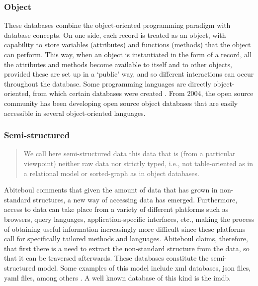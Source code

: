 \subsubsection{Object}
\label{model:object}


These databases combine the object-oriented programming paradigm with database concepts. On one side, each record is treated as an object, with capability to store variables (attributes) and functions (methods) that the object can perform. This way, when an object is instantiated in the form of a record, all the attributes and methods become available to itself and to other objects, provided these are set up in a `public' way, and so different interactions can occur throughout the database. Some programming languages are directly object-oriented, from which certain databases were created . From 2004, the open source community has been developing open source object databases that are easily accessible in several object-oriented languages.

\subsubsection{Semi-structured}
\label{model:semistructured}


\begin{quote}
	We call here semi-structured data this data that is (from a particular viewpoint) neither raw data nor strictly typed, i.e., not table-oriented as in a relational model or sorted-graph as in object databases. \parencite{Abiteboul:semistructured:96}
\end{quote}

Abiteboul \parencite{Abiteboul:semistructured:96} comments that given the amount of data that has grown in non-standard structures, a new way of accessing data has emerged. Furthermore, access to data can take place from a variety of different platforms such as browsers, query languages, application-specific interfaces, etc., making the process of obtaining useful information increasingly more difficult since these platforms call for specifically tailored methods and languages. Abiteboul claims, therefore, that first there is a need to extract the non-standard structure from the data, so that it can be traversed afterwards. These databases constitute the semi-structured model. Some examples of this model include \gls{xml} databases, \gls{json} files, \gls{yaml} files, among others \parencite{Buneman:1997:SD:263661.263675}. A well known database of this kind is the \gls{imdb}.

